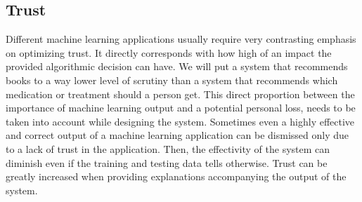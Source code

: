 




\subsection{Trust}
Different machine learning applications usually require very contrasting emphasis on optimizing trust. It directly corresponds with how high of an impact the provided algorithmic decision can have. We will put a system that recommends books to a way lower level of scrutiny than a system that recommends which medication or treatment should a person get. This direct proportion between the importance of machine learning output and a potential personal loss, needs to be taken into account while designing the system. Sometimes even a highly effective and correct output of a machine learning application can be dismissed only due to a lack of trust in the application. Then, the effectivity of the system can diminish even if the training and testing data tells otherwise. Trust can be greatly increased when providing explanations accompanying the output of the system.

